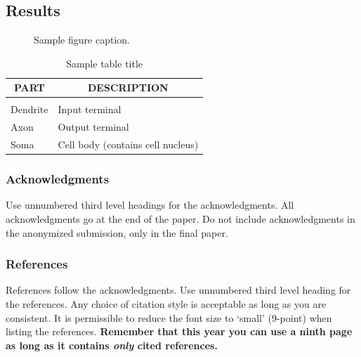 \documentclass{article} %
\begin{document}
    \subsection{Results} %
    \label{sub:Results}
    

\begin{figure}[h]
    \begin{center}
    \fbox{\rule[-.5cm]{0cm}{4cm} \rule[-.5cm]{4cm}{0cm}}
    \end{center}
    \caption{Sample figure caption.}
\end{figure}

\begin{table}[t]
    \caption{Sample table title}
    \begin{center}
        \begin{tabular}{ll}
        \multicolumn{1}{c}{\bf PART}  &\multicolumn{1}{c}{\bf DESCRIPTION}
        \\ \hline \\
        Dendrite         &Input terminal \\
        Axon             &Output terminal \\
        Soma             &Cell body (contains cell nucleus) \\
        \end{tabular}
    \end{center}
\end{table}

\subsubsection*{Acknowledgments}

Use unnumbered third level headings for the acknowledgments. All
acknowledgments go at the end of the paper. Do not include 
acknowledgments in the anonymized submission, only in the 
final paper. 

\subsubsection*{References}

References follow the acknowledgments. Use unnumbered third level heading for
the references. Any choice of citation style is acceptable as long as you are
consistent. It is permissible to reduce the font size to `small' (9-point) 
when listing the references. {\bf Remember that this year you can use
a ninth page as long as it contains \emph{only} cited references.}
\end{document}
